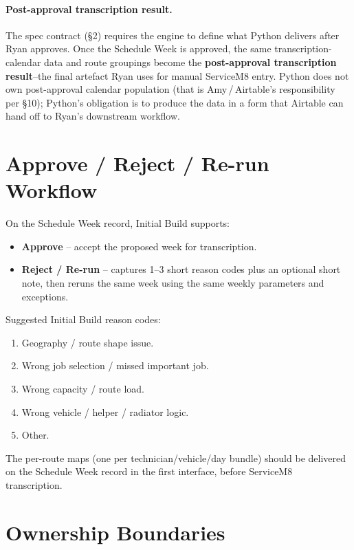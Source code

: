 \documentclass[12pt]{article}
\begin{document}
\paragraph{Post-approval transcription result.}
The spec contract (\S2) requires the engine to define what Python delivers after Ryan approves.
Once the Schedule Week is approved, the same transcription-calendar data and route groupings become the \textbf{post-approval transcription result}--the final artefact Ryan uses for manual ServiceM8 entry.
Python does not own post-approval calendar population (that is Amy\,/\,Airtable's responsibility per \S10); Python's obligation is to produce the data in a form that Airtable can hand off to Ryan's downstream workflow.

\section*{Approve / Reject / Re-run Workflow}
\label{sec:approve}

On the Schedule Week record, Initial Build supports:
\begin{itemize}
    \item \textbf{Approve} -- accept the proposed week for transcription.
    \item \textbf{Reject / Re-run} -- captures 1--3 short reason codes plus an optional short note, then reruns the same week using the same weekly parameters and exceptions.
\end{itemize}

Suggested Initial Build reason codes:
\begin{enumerate}
    \item Geography / route shape issue.
    \item Wrong job selection / missed important job.
    \item Wrong capacity / route load.
    \item Wrong vehicle / helper / radiator logic.
    \item Other.
\end{enumerate}

The per-route maps (one per technician/vehicle/day bundle) should be delivered on the Schedule Week record in the first interface, before ServiceM8 transcription.

\section*{Ownership Boundaries}
\label{sec:ownership}
\end{document}
